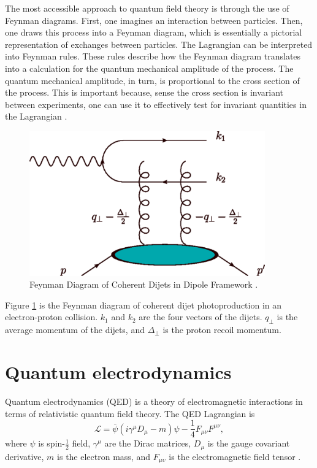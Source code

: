The most accessible approach to quantum field theory is through the use of Feynman diagrams. First, one imagines an interaction between particles. Then, one draws this process into a Feynman diagram, which is essentially a pictorial representation of exchanges between particles. The Lagrangian can be interpreted into Feynman rules. These rules describe how the Feynman diagram translates into a calculation for the quantum mechanical amplitude of the process. The quantum mechanical amplitude, in turn, is proportional to the cross section of the process. This is important because, sense the cross section is invariant between experiments, one can use it to effectively test for invariant quantities in the Lagrangian \cite{Peskin:1995ev}. 

\begin{figure}[h!]
\begin{centering}
\includegraphics[width=4in]{Chapter1/importfigs/fig4_yatta.png}
\par\end{centering}
\caption{Feynman Diagram of Coherent Dijets in Dipole Framework \cite{Hatta:2016dxp}.\label{fig:yatta1}}
\end{figure}

Figure \ref{fig:yatta1} is the Feynman diagram of coherent dijet photoproduction in an electron-proton collision. $k_1$ and $k_2$ are the four vectors of the dijets. $q_\perp$ is the average momentum of the dijets, and $\Delta_\perp$ is the proton recoil momentum. 

\section{Quantum electrodynamics}

Quantum electrodynamics (QED) is a theory of electromagnetic interactions in terms of relativistic quantum field theory. The QED Lagrangian is
\begin{equation}
{\mathcal {L}}={\bar {\psi }}(i\gamma ^{\mu }D_{\mu }-m)\psi -{\frac {1}{4}}F_{\mu \nu }F^{\mu \nu },
\end{equation} 
where $\psi$ is spin-$\frac{1}{2}$ field, $\gamma^\mu$ are the Dirac matrices, $D_\mu$ is the gauge covariant derivative, $m$ is the electron mass, and $F_{\mu\upsilon}$ is the electromagnetic field tensor \cite{Peskin:1995ev}.

